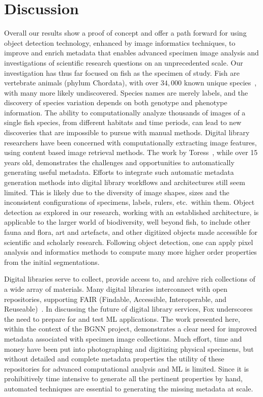 \documentclass[conference]{IEEEtran}
\begin{document}
\section{Discussion}
Overall our results show a proof of concept and offer a path forward for using object detection technology, enhanced by image informatics techniques, to improve and enrich metadata that enables advanced specimen image analysis and investigations of scientific research questions on an unprecedented
scale. Our investigation has thus far focused on fish as the specimen of study. Fish are vertebrate animals (phylum Chordata), with over \(34,000\) known unique species~\cite{fishbase},
with many more likely undiscovered. Species names are merely labels, and the discovery of species variation depends on both genotype and phenotype information. The ability to computationally analyze thousands of images of a single fish species, from different habitats and time periods, can lead to new discoveries that are impossible to pursue with manual methods.
Digital library researchers have been concerned with computationally extracting image features, using content based image retrieval methods. The work by Toress~\cite{torres2006digital}, while over 15 years old, demonstrates the challenges and opportunities to automatically generating useful metadata.
Efforts to integrate such automatic metadata generation methods into digital library workflows and architectures still seem limited.
This is likely due to the diversity of image shapes, sizes and the inconsistent configurations of specimens, labels, rulers, etc.\ within them. Object detection as explored in our research, working with an established architecture, is applicable to the larger world of biodiversity, well beyond fish, to include other fauna and flora, art and artefacts, and other digitized objects made accessible for scientific and scholarly research. Following object
detection, one can apply pixel analysis and informatics methods to compute
many more higher order properties from the initial segmentations.

Digital libraries serve to collect, provide access to, and archive rich collections of a wide array of materials. Many digital libraries interconnect with open repositories, supporting FAIR (Findable, Accessible, Interoperable, and Reuseable)~\cite{wilkinson2016fair}. In discussing the future of digital library services, Fox \cite{fox2021building} underscores the need to prepare for and test ML applications. The work presented here, within the context of the BGNN project, demonstrates a clear need for improved metadata associated with specimen image collections. Much effort, time and money have been put into photographing and digitizing physical specimens, but without detailed and complete metadata properties the utility of these repositories for advanced computational analysis and ML is limited. Since it is prohibitively time intensive to generate all the pertinent properties by hand, automated techniques are essential to generating the missing metadata at scale.
\end{document}

